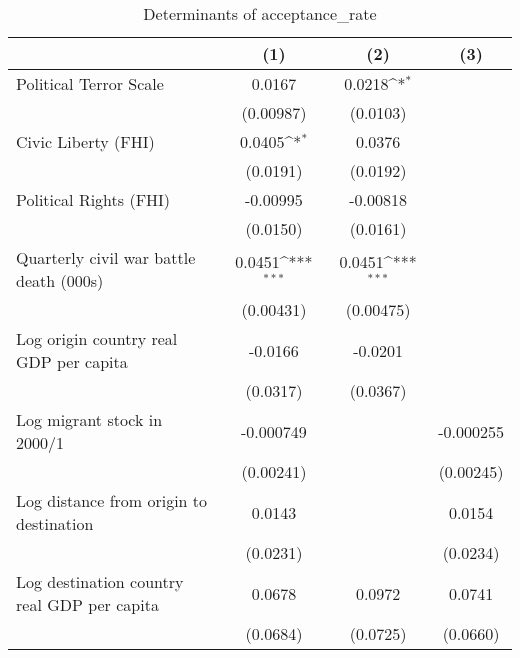\begin{table}[htbp]\centering
\def\sym#1{\ifmmode^{#1}\else\(^{#1}\)\fi}
\caption{Determinants of acceptance\_rate}
\begin{tabular}{l*{3}{c}}
\hline\hline
                    &\multicolumn{1}{c}{(1)}         &\multicolumn{1}{c}{(2)}         &\multicolumn{1}{c}{(3)}         \\
\hline
Political Terror Scale&      0.0167         &      0.0218\sym{*}  &                     \\
                    &   (0.00987)         &    (0.0103)         &                     \\
[1em]
Civic Liberty (FHI) &      0.0405\sym{*}  &      0.0376         &                     \\
                    &    (0.0191)         &    (0.0192)         &                     \\
[1em]
Political Rights (FHI)&    -0.00995         &    -0.00818         &                     \\
                    &    (0.0150)         &    (0.0161)         &                     \\
[1em]
Quarterly civil war battle death (000s)&      0.0451\sym{***}&      0.0451\sym{***}&                     \\
                    &   (0.00431)         &   (0.00475)         &                     \\
[1em]
Log origin country real GDP per capita&     -0.0166         &     -0.0201         &                     \\
                    &    (0.0317)         &    (0.0367)         &                     \\
[1em]
Log migrant stock in 2000/1&   -0.000749         &                     &   -0.000255         \\
                    &   (0.00241)         &                     &   (0.00245)         \\
[1em]
Log distance from origin to destination&      0.0143         &                     &      0.0154         \\
                    &    (0.0231)         &                     &    (0.0234)         \\
[1em]
Log destination country real GDP per capita&      0.0678         &      0.0972         &      0.0741         \\
                    &    (0.0684)         &    (0.0725)         &    (0.0660)         \\

\end{tabular}
\end{table}
